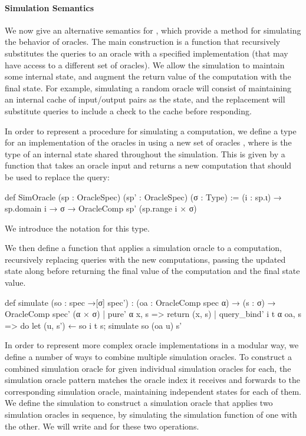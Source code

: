\paragraph{Simulation Semantics}
We now give an alternative semantics for , which provide a method for simulating the behavior of oracles.
The main construction is a function  that recursively substitutes the queries to an oracle with a specified implementation (that may have access to a different set of oracles).
We allow the simulation to maintain some internal state, and augment the return value of the computation with the final state.
For example, simulating a random oracle will consist of maintaining an internal cache of input/output pairs as the state, and the replacement will substitute queries to include a check to the cache before responding.

In order to represent a procedure for simulating a computation, we define a type     for an implementation of the oracles in  using a new set of oracles , where  is the type of an internal state shared throughout the simulation.
This is given by a function that takes an oracle input and returns a new computation that should be used to replace the query:
\begin{leancode}
  def SimOracle (sp : OracleSpec) (sp' : OracleSpec) (σ : Type) :=
    (i : sp.ι) → sp.domain i → σ → OracleComp sp' (sp.range i × σ)
\end{leancode}
We introduce the notation  for this type.

We then define a function  that applies a simulation oracle to a computation, recursively replacing queries with the new computations, passing the updated state along before returning the final value of the computation and the final state value.
\begin{leancode}
  def simulate (so : spec →[σ] spec') :
      (oa : OracleComp spec α) → (s : σ) → OracleComp spec' (α × σ)
    | pure' α x, s => return (x, s)
    | query_bind' i t α oa, s => do let (u, s') ← so i t s;
        simulate so (oa u) s'
\end{leancode}

In order to represent more complex oracle implementations in a modular way, we define a number of ways to combine multiple simulation oracles.
To construct a combined simulation oracle for 
given individual simulation oracles for each, the simulation oracle pattern matches the oracle index it receives and forwards to the corresponding simulation oracle, maintaining independent states for each of them.
We define the  simulation to construct a simulation oracle that applies two simulation oracles in sequence, by simulating the simulation function of one with the other.  We will write \lean{++} and  for these two operations.

